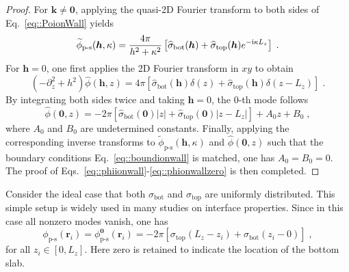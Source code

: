 \begin{proof}
	For $\bm{k}\neq\bm{0}$, applying the quasi-2D Fourier transform to both sides of Eq.~\eqref{eq::PoionWall} yields
	\begin{equation}
		\widetilde{\phi}_{\text{p-s}}(\bm{h},\kappa)=\frac{4\pi}{h^2+\kappa^2}\left[\widehat{\sigma}_{\mathrm{bot}}(\bm{h})+\widehat{\sigma}_{\mathrm{top}}(\bm{h})e^{-\mathrm{i} \kappa L_z}\right]\;.
	\end{equation}
	For $\bm{h}=0$, one first applies the 2D Fourier transform in $xy$ to obtain
	\begin{equation}
		\left(-\partial_z^2+h^2\right)\widehat{\phi}(\bm{h},z)=4\pi\left[\widehat{\sigma}_{\mathrm{bot}}(\bm{h})\delta(z)+\widehat{\sigma}_{\mathrm{top}}(\bm{h})\delta(z-L_z)\right]\;.
	\end{equation}
	By integrating both sides twice and taking $\bm{h}=0$, the $0$-th mode follows 
	\begin{equation}
		\widehat{\phi}(\bm{0},z)=-2\pi\left[\widehat{\sigma}_{\mathrm{bot}}(\bm{0})|z|+\widehat{\sigma}_{\mathrm{top}}(\bm{0})|z-L_z|\right]+A_0z+B_0\;,
	\end{equation}
	where $A_0$ and $B_0$ are undetermined constants. 
	Finally, applying the corresponding inverse transforms to $\widetilde{\phi}_{\text{p-s}}(\bm{h},\kappa)$ and $\widehat{\phi}(\bm{0},z)$ such that the boundary conditions Eq.~\eqref{eq::boundionwall} is matched, one has $A_0=B_0=0$. The proof of Eqs.~\eqref{eq::phiionwall}-\eqref{eq::phionwallzero} is then completed. 
\end{proof}


Consider the ideal case that both $\sigma_{\mathrm{bot}}$ and $\sigma_{\mathrm{top}}$ are uniformly distributed. This simple setup is widely used in many studies on interface properties. Since in this case all nonzero modes vanish, one has
\begin{equation}\label{eq:spectial}
	\phi_{\text{p-s}}(\bm{r}_{i})=\phi_{\text{p-s}}^{\bm{0}}(\bm{r}_{i})=-2\pi\left[\sigma_{\mathrm{top}}(L_z - z_{i})+\sigma_{\mathrm{bot}}(z_{i} - 0)\right]\;,
\end{equation}
for all $z_{i}\in [0, L_z]$. 
Here zero is retained to indicate the location of the bottom slab. 

